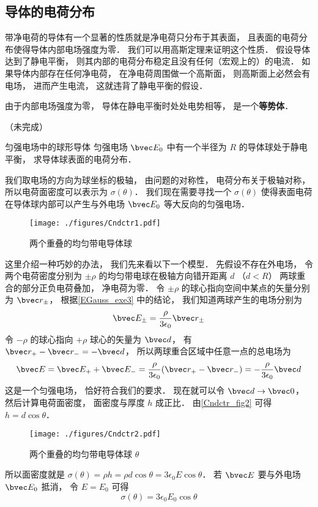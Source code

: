 

\subsection{导体的电荷分布}
带净电荷的导体有一个显著的性质就是净电荷只分布于其表面， 且表面的电荷分布使得导体内部电场强度为零． 我们可以用高斯定理来证明这个性质． 假设导体达到了静电平衡， 则其内部的电荷分布稳定且没有任何（宏观上的）的电流． 如果导体内部存在任何净电荷， 在净电荷周围做一个高斯面， 则高斯面上必然会有电场， 进而产生电流， 这就违背了静电平衡的假设．

由于内部电场强度为零， 导体在静电平衡时处处电势相等， 是一个\textbf{等势体}．


（未完成）

\begin{example}{匀强电场中的球形导体}
匀强电场 $\bvec E_0$ 中有一个半径为 $R$ 的导体球处于静电平衡， 求导体球表面的电荷分布．

我们取电场的方向为球坐标的极轴， 由问题的对称性， 电荷分布关于极轴对称， 所以电荷面密度可以表示为 $\sigma(\theta)$． 我们现在需要寻找一个 $\sigma(\theta)$ 使得表面电荷在导体球内部可以产生与外电场 $\bvec E_0$ 等大反向的匀强电场．

\begin{figure}[ht]
\centering
\texttt{[image: ./figures/Cndctr1.pdf]}
\caption{两个重叠的均匀带电导体球} \label{Cndctr_fig1}
\end{figure}

这里介绍一种巧妙的办法， 我们先来看以下一个模型． 先假设不存在外电场， 令两个电荷密度分别为 $\pm\rho$ 的均匀带电球在极轴方向错开距离 $d$ （$d < R$） 两球重合的部分正负电荷叠加， 净电荷为零． 令 $\pm\rho$ 的球心指向空间中某点的矢量分别为 $\bvec r_\pm$， 根据\autoref{EGauss_exe3} 中的结论， 我们知道两球产生的电场分别为
\begin{equation}
\bvec E_\pm = \frac{\rho}{3\epsilon_0}\bvec r_\pm
\end{equation}
令 $-\rho$ 的球心指向 $+\rho$ 球心的矢量为 $\bvec d$， 有 $\bvec r_+ - \bvec r_- = -\bvec d$， 所以两球重合区域中任意一点的总电场为
\begin{equation}
\bvec E = \bvec E_+ + \bvec E_- = \frac{\rho}{3\epsilon_0}(\bvec r_+ - \bvec r_-) = -\frac{\rho}{3\epsilon_0}\bvec d
\end{equation}
这是一个匀强电场， 恰好符合我们的要求． 现在就可以令 $\bvec d\to \bvec 0$， 然后计算电荷面密度， 面密度与厚度 $h$ 成正比． 由\autoref{Cndctr_fig2} 可得 $h = d\cos\theta$．

\begin{figure}[ht]
\centering
\texttt{[image: ./figures/Cndctr2.pdf]}
\caption{两个重叠的均匀带电导体球 $\theta$} \label{Cndctr_fig2}
\end{figure}

所以面密度就是 $\sigma(\theta) = \rho h = \rho d\cos\theta = 3\epsilon_0 E \cos\theta$． 若 $\bvec E$ 要与外电场 $\bvec E_0$ 抵消， 令 $E = E_0$ 可得
\begin{equation}
\sigma(\theta) = 3\epsilon_0 E_0 \cos\theta
\end{equation}
\end{example}

